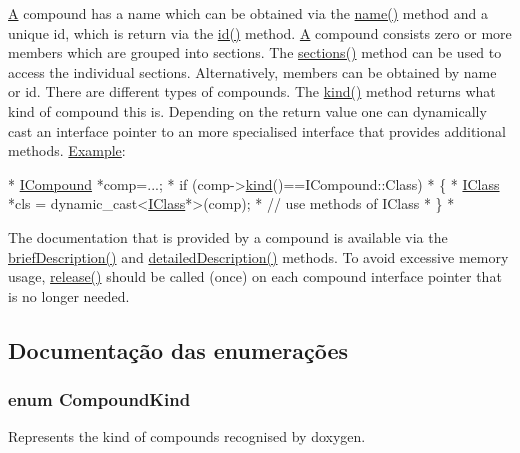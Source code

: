\hyperlink{class_a}{A} compound has a name which can be obtained via the \hyperlink{class_i_compound_af687440943d0a80c2b38cd5bb51b7a68}{name()} method and a unique id, which is return via the \hyperlink{class_i_compound_aaba28daa272dce8bc14dde330d5b0126}{id()} method. \hyperlink{class_a}{A} compound consists zero or more members which are grouped into sections. The \hyperlink{class_i_compound_a27ef6c7f6cb888a9b017c06c062a13b5}{sections()} method can be used to access the individual sections. Alternatively, members can be obtained by name or id. There are different types of compounds. The \hyperlink{class_i_compound_aee9f3639e2f2fa0f1d9f3729fa8d4d51}{kind()} method returns what kind of compound this is. Depending on the return value one can dynamically cast an interface pointer to an more specialised interface that provides additional methods. \hyperlink{struct_example}{Example}\-: 
\begin{DoxyCode}
*  \hyperlink{class_i_compound}{ICompound} *comp=...;
*  \textcolor{keywordflow}{if} (comp->\hyperlink{class_i_compound_aee9f3639e2f2fa0f1d9f3729fa8d4d51}{kind}()==ICompound::Class)
*  \{
*    \hyperlink{class_i_class}{IClass} *cls = \textcolor{keyword}{dynamic\_cast<}\hyperlink{class_i_class}{IClass}*\textcolor{keyword}{>}(comp);
*    \textcolor{comment}{// use methods of IClass}
*  \}
*  
\end{DoxyCode}
 The documentation that is provided by a compound is available via the \hyperlink{class_i_compound_a8a0da25a8851dfb809394c4d6585efb2}{brief\-Description()} and \hyperlink{class_i_compound_a3fd3d8b278a1e0787d51861984fdc73e}{detailed\-Description()} methods. To avoid excessive memory usage, \hyperlink{class_i_compound_aab0a52fdd148a54108e7bf49287d7c47}{release()} should be called (once) on each compound interface pointer that is no longer needed. 

\subsection{Documentação das enumerações}
\hypertarget{class_i_compound_a7063885b1cabbff5f94849960f08ecb2}{
\subsubsection[{Compound\-Kind}]{\setlength{\rightskip}{0pt plus 5cm}enum {\bf Compound\-Kind}}}\label{class_i_compound_a7063885b1cabbff5f94849960f08ecb2}
Represents the kind of compounds recognised by doxygen. 

